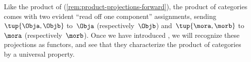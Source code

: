 \begin{remark}
    \label{rem:product-cat-projections-forward}
    Like the product of  (\cref{rem:product-projections-forward}), the product of categories comes with two evident ``read off one component'' assignments, sending~$\tup{\Obja, \Objb}$ to~$\Obja$ (respectively~$\Objb$) and~$\tup{\mora, \morb}$ to~$\mora$ (respectively~$\morb$).
    Once we have introduced , we will recognize these projections as functors, and see that they characterize the product of categories by a universal property.
\end{remark}

